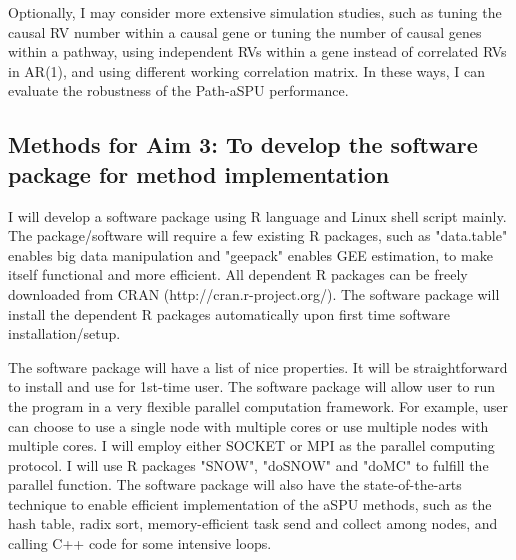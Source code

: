 \documentclass[12pt]{article}
\begin{document}
Optionally, I may consider more extensive simulation studies, such as tuning the causal RV number within a causal gene or tuning the number of causal genes within a pathway, using independent RVs within a gene instead of correlated RVs in AR(1), and using different working correlation matrix. In these ways,  I can evaluate the robustness of the Path-aSPU performance.

\subsection{Methods for Aim 3: To develop the software package for method implementation}
\label{sec:aim3}
I will develop a software package using R language and Linux shell script mainly. The package/software will require a few existing R packages, such as "data.table" enables big data manipulation and "geepack" enables GEE estimation, to make itself functional and more efficient. All dependent R packages can be freely downloaded from CRAN (http://cran.r-project.org/). The software package will install the dependent R packages automatically upon first time software installation/setup. 

The software package will have a list of nice properties. It will be straightforward to install and use for 1st-time user. The software package will allow user to run the program in a very flexible parallel computation framework. For example, user can choose to use a single node with multiple cores or use multiple nodes with multiple cores. I will employ either SOCKET or MPI as the parallel computing protocol. I will use R packages "SNOW", "doSNOW" and "doMC" to fulfill the parallel function. The software package will also have the state-of-the-arts technique to enable efficient implementation of the aSPU methods, such as the hash table, radix sort, memory-efficient task send and collect among nodes, and calling C++ code for some intensive loops. 
\end{document}
